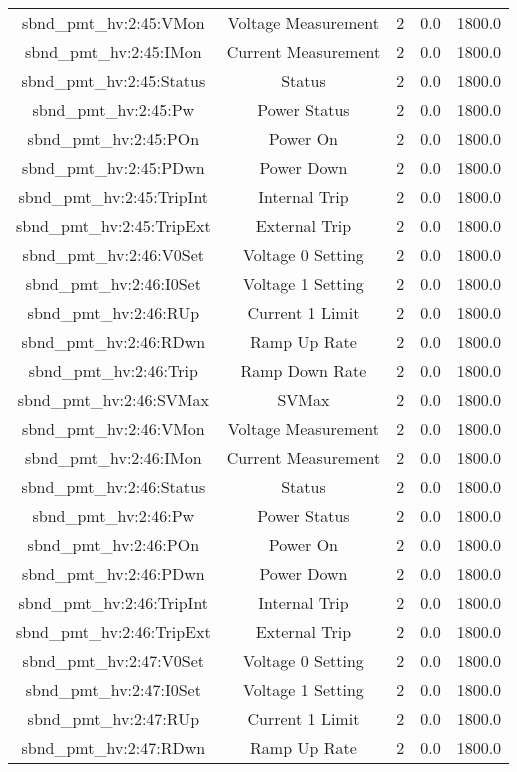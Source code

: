 \begin{center}
\begin{longtable}{c | c c c c }
sbnd\_pmt\_hv:2:45:VMon & Voltage Measurement & 2 & 0.0 & 1800.0\\ 
sbnd\_pmt\_hv:2:45:IMon & Current Measurement & 2 & 0.0 & 1800.0\\ 
sbnd\_pmt\_hv:2:45:Status & Status & 2 & 0.0 & 1800.0\\ 
sbnd\_pmt\_hv:2:45:Pw & Power Status & 2 & 0.0 & 1800.0\\ 
sbnd\_pmt\_hv:2:45:POn & Power On & 2 & 0.0 & 1800.0\\ 
sbnd\_pmt\_hv:2:45:PDwn & Power Down & 2 & 0.0 & 1800.0\\ 
sbnd\_pmt\_hv:2:45:TripInt & Internal Trip & 2 & 0.0 & 1800.0\\ 
sbnd\_pmt\_hv:2:45:TripExt & External Trip & 2 & 0.0 & 1800.0\\ 
sbnd\_pmt\_hv:2:46:V0Set & Voltage 0 Setting & 2 & 0.0 & 1800.0\\ 
sbnd\_pmt\_hv:2:46:I0Set & Voltage 1 Setting & 2 & 0.0 & 1800.0\\ 
sbnd\_pmt\_hv:2:46:RUp & Current 1 Limit & 2 & 0.0 & 1800.0\\ 
sbnd\_pmt\_hv:2:46:RDwn & Ramp Up Rate & 2 & 0.0 & 1800.0\\ 
sbnd\_pmt\_hv:2:46:Trip & Ramp Down Rate & 2 & 0.0 & 1800.0\\ 
sbnd\_pmt\_hv:2:46:SVMax & SVMax & 2 & 0.0 & 1800.0\\ 
sbnd\_pmt\_hv:2:46:VMon & Voltage Measurement & 2 & 0.0 & 1800.0\\ 
sbnd\_pmt\_hv:2:46:IMon & Current Measurement & 2 & 0.0 & 1800.0\\ 
sbnd\_pmt\_hv:2:46:Status & Status & 2 & 0.0 & 1800.0\\ 
sbnd\_pmt\_hv:2:46:Pw & Power Status & 2 & 0.0 & 1800.0\\ 
sbnd\_pmt\_hv:2:46:POn & Power On & 2 & 0.0 & 1800.0\\ 
sbnd\_pmt\_hv:2:46:PDwn & Power Down & 2 & 0.0 & 1800.0\\ 
sbnd\_pmt\_hv:2:46:TripInt & Internal Trip & 2 & 0.0 & 1800.0\\ 
sbnd\_pmt\_hv:2:46:TripExt & External Trip & 2 & 0.0 & 1800.0\\ 
sbnd\_pmt\_hv:2:47:V0Set & Voltage 0 Setting & 2 & 0.0 & 1800.0\\ 
sbnd\_pmt\_hv:2:47:I0Set & Voltage 1 Setting & 2 & 0.0 & 1800.0\\ 
sbnd\_pmt\_hv:2:47:RUp & Current 1 Limit & 2 & 0.0 & 1800.0\\ 
sbnd\_pmt\_hv:2:47:RDwn & Ramp Up Rate & 2 & 0.0 & 1800.0\\ 

\end{longtable}
\end{center}
